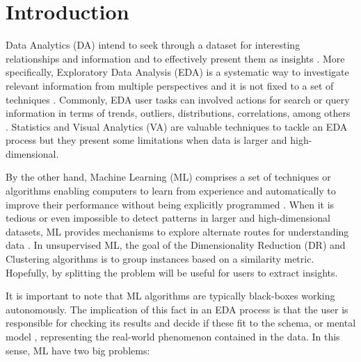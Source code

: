 
\chapter{Introduction}
\label{chapter1}

\graphicspath{{Chapter1/figs/}}

Data Analytics (DA) intend to seek through a dataset for interesting relationships and information and to effectively present them as insights \cite{TukeyJohnW.andWilk1966DataOverview}. More specifically, Exploratory Data Analysis (EDA) is a systematic way to investigate relevant information from multiple perspectives and it is not fixed to a set of techniques \cite{Yu2003ExploratoryAnalysis}. Commonly, EDA user tasks can involved actions for search or query information in terms of trends, outliers, distributions, correlations, among others \cite{Munzner2014VisualizationDesign}. Statistics and Visual Analytics (VA) are valuable techniques to tackle an EDA process but they present some limitations when data is larger and high-dimensional.

By the other hand, Machine Learning (ML) comprises a set of techniques or algorithms enabling computers to learn from experience and automatically to improve their performance \cite{Michie1968MemoLearning} without being explicitly programmed \cite{Koza1996}. When it is tedious or even impossible to detect patterns in larger and high-dimensional datasets, ML provides mechanisms to explore alternate routes for understanding data \cite{Yu2003ExploratoryAnalysis}. In unsupervised ML, the goal of the Dimensionality Reduction (DR) and Clustering algorithms is to group instances based on a similarity metric. Hopefully, by splitting the problem will be useful for users to extract insights.

It is important to note that ML algorithms are typically black-boxes working autonomously. The implication of this fact in an EDA process is that the user is responsible for checking its results and decide if these fit to the schema, or mental model \cite{Grolemund2014AAnalysis}, representing the real-world phenomenon contained in the data. In this sense, ML have two big problems: 

